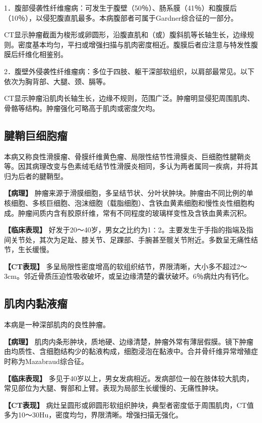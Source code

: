 1．腹部侵袭性纤维瘤病：可发生于腹壁（50％）、肠系膜（41％）和腹膜后（10％），以侵犯腹直肌最多。本病腹部者可属于Gardner综合征的一部分。

CT显示肿瘤截面为梭形或卵圆形，沿腹直肌和（或）腹斜肌等长轴生长，边缘规则。密度基本均匀，平扫或增强扫描与肌肉密度相近。腹膜后者应注意与特发性腹膜后纤维化相鉴别。

2．腹壁外侵袭性纤维瘤病：多位于四肢、躯干深部软组织，以肩部最常见。以下依次为胸背部、大腿、颈、膈等。

CT显示肿瘤沿肌肉长轴生长，边缘不规则，范围广泛。肿瘤明显侵犯周围肌肉、骨骼等结构。肿瘤强化可略高于肌肉或密度欠均。

\subsection{腱鞘巨细胞瘤}

本病又称良性滑膜瘤、骨膜纤维黄色瘤、局限性结节性滑膜炎、巨细胞性腱鞘炎等。因其病理改变与色素绒毛结节性滑膜炎相同，多认为两者属同一疾病，并将其归为后者的腱鞘型。

\textbf{【病理】}
肿瘤来源于滑膜细胞，多呈结节状、分叶状肿块。肿瘤由不同比例的单核细胞、多核巨细胞、泡沫细胞（载脂细胞）、含铁血黄素细胞和慢性炎性细胞构成。肿瘤间质内含有胶原纤维，常有不同程度的玻璃样变性及含铁血黄素沉积。

\textbf{【临床表现】}
好发于20～40岁，男女之比约为1∶2。主要发生于手指的指端及指间关节处，其次为足趾、膝关节、足踝部、手腕甚至髋关节附近。多数呈无痛性结节，生长缓慢。

\textbf{【CT表现】}
多呈局限性密度增高的软组织结节，界限清晰，大小多不超过2～3cm。邻近骨质压迫性吸收破坏，或呈边缘清楚的囊状破坏。6％病灶内有钙化。

\subsection{肌肉内黏液瘤}

本病是一种深部肌肉的良性肿瘤。

\textbf{【病理】}
肌肉内条形肿块，质地硬、边缘清楚，肿瘤外常有薄层假膜。镜下肿瘤由均质性、含细胞结构少的黏液构成，细胞浸泡在黏液中。合并骨纤维异常增殖症时称为Mazabraud综合征。

\textbf{【临床表现】}
多见于40岁以上，男女发病相近。发病部位一般在肢体较大肌肉，常见部位为大腿、臀部和上臂。表现为局部生长缓慢的、无痛性肿块。

\textbf{【CT表现】}
病灶呈圆形或卵圆形软组织肿块，典型者密度低于周围肌肉，CT值多为10～30Hu，密度均匀，界限清晰。增强扫描无强化。

